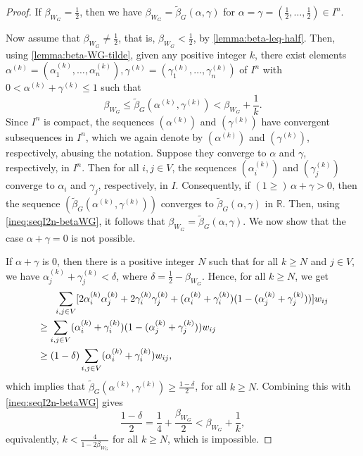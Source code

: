 \documentclass[12pt,a4paper,bold]{thesis}
\theoremstyle{definition}
\begin{document}
\begin{proof}
    If $\beta_{W_G} = \frac{1}{2}$, then we have 
    $\beta_{W_G} = \tilde \beta_G(\alpha,\gamma)$ for 
    $\alpha = \gamma = \left(\frac{1}{2}, \dots, \frac{1}{2}\right) \in I^n$.

    Now assume that $\beta_{W_G} \neq \frac{1}{2}$, that is, $\beta_{W_G} < \frac{1}{2}$,
    by \cref{lemma:beta-leq-half}. Then, using \cref{lemma:beta-WG-tilde}, 
    given any positive integer $k$, there exist elements 
    $\alpha^{(k)} = (\alpha_1^{(k)}, \dots, \alpha_n^{(k)}), 
    \gamma^{(k)} = (\gamma_1^{(k)}, \dots, \gamma_n^{(k)})$ of $I^n$ with 
    $0 < \alpha^{(k)} + \gamma^{(k)} \leq 1$ such that
    \begin{equation} \label{ineq:seqI2n-betaWG}
        \beta_{W_G} \leq \tilde \beta_G(\alpha^{(k)},\gamma^{(k)}) 
        < \beta_{W_G} + \frac{1}{k}.
    \end{equation}
    Since $I^n$ is compact, the sequences $(\alpha^{(k)})$ and $(\gamma^{(k)})$ 
    have convergent subsequences in $I^n$, which we again denote by 
    $(\alpha^{(k)})$ and $(\gamma^{(k)})$, respectively, abusing the notation. 
    Suppose they converge to $\alpha$ and $\gamma$, respectively, in $I^n$. 
    Then for all $i,j \in V$, the sequences $(\alpha_i^{(k)})$ and $(\gamma_j^{(k)})$ 
    converge to $\alpha_i$ and $\gamma_j$, respectively, in $I$. 
    Consequently, if $(1 \geq)\, \alpha + \gamma > 0$, then the sequence
    $\left(\tilde \beta_G(\alpha^{(k)},\gamma^{(k)})\right)$ converges to 
    $\tilde \beta_G(\alpha,\gamma)$ in $\mathbb{R}$. Then, using \cref{ineq:seqI2n-betaWG},
    it follows that $\beta_{W_G} = \tilde \beta_G(\alpha,\gamma)$. 
    We now show that the case $\alpha + \gamma = 0$ is not possible. 
    
    If $\alpha + \gamma$ is $0$, then there is a positive integer $N$ such that 
    for all $k \geq N$ and $j \in V$, we have $\alpha_j^{(k)} + \gamma_j^{(k)} < \delta$, 
    where $\delta = \frac{1}{2} - \beta_{W_G}$. Hence, for all $k \geq N$, we get
    \begin{align*}
        & \hspace{0.6cm}
        \sum_{i,j \in V} [2 \alpha_i^{(k)} \alpha_j^{(k)} + 2 \gamma_i^{(k)} \gamma_j^{(k)} 
        + (\alpha_i^{(k)} + \gamma_i^{(k)})(1 - (\alpha_j^{(k)} + \gamma_j^{(k)}))] w_{ij}
        \\
        & \geq
        \sum_{i,j \in V} (\alpha_i^{(k)} 
        + \gamma_i^{(k)})(1 - (\alpha_j^{(k)} + \gamma_j^{(k)})) w_{ij}
        \\
        & \geq
        (1 - \delta) \sum_{i,j \in V} (\alpha_i^{(k)} + \gamma_i^{(k)}) w_{ij},
    \end{align*}
    which implies that 
    $\tilde \beta_G(\alpha^{(k)}, \gamma^{(k)}) \geq \frac{1 -\delta}{2}$, for all $k \geq N$.
    Combining this with \cref{ineq:seqI2n-betaWG} gives
    \begin{equation*}
        \frac{1 -\delta}{2} = \frac{1}{4} + \frac{\beta_{W_G}}{2} 
        < \beta_{W_G} + \frac{1}{k},
    \end{equation*}
    equivalently, $k < \frac{4}{1 - 2 \beta_{W_G}}$ for all $k \geq N$, which is impossible.
\end{proof}
\end{document}
